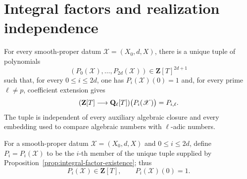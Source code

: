 

\section{Integral factors and realization independence}

\begin{proposition}
\label{prop:integral-factor-existence}


For every smooth-proper datum \(\mathscr X=(X_0,d,X)\), there is a unique
tuple of polynomials
\[
 (P_0(\mathscr X),\ldots,P_{2d}(\mathscr X))\in\mathbf Z[T]^{2d+1}
\]
such that, for every \(0\leq i\leq2d\), one has
\(P_i(\mathscr X)(0)=1\) and, for every prime \(\ell\neq p\), coefficient
extension gives
\[
 (\mathbf Z[T]\longrightarrow\mathbf Q_{\ell}[T])\bigl(P_i(\mathscr X)\bigr)
 =P_{i,\ell}.
\]
The tuple is independent of every auxiliary algebraic closure and every
embedding used to compare algebraic numbers with \(\ell\)-adic numbers.
\end{proposition}


\begin{definition}
\label{def:canonical-cohomological-factors}


For a smooth-proper datum \(\mathscr X=(X_0,d,X)\) and
\(0\leq i\leq2d\), define \(P_i=P_i(\mathscr X)\) to be the \(i\)-th
member of the unique tuple supplied by
Proposition~\ref{prop:integral-factor-existence}; thus
\[
 P_i(\mathscr X)\in\mathbf Z[T],\qquad P_i(\mathscr X)(0)=1.
\]
\end{definition}


